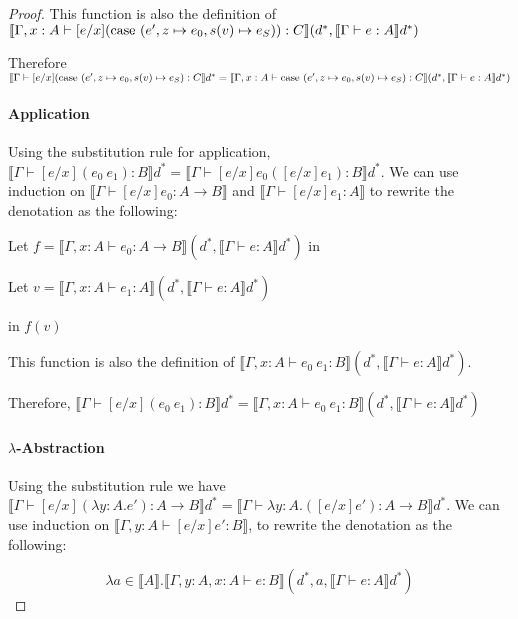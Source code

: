 \begin{proof}
This function is also the definition of $\llbracket \Gamma , x : A \vdash [e/x](\case \ (e',z \mapsto e_0, s(v) \mapsto e_S)): C \rrbracket (d^*, \llbracket \Gamma \vdash e : A \rrbracket d^*)$

Therefore $\llbracket \Gamma \vdash [e/x] (\operatorname{case} \ (e', z \mapsto e_0, s(v) \mapsto e_S): C \rrbracket d^* = \llbracket \Gamma , x : A \vdash \operatorname{case} \ (e', z \mapsto e_0, s(v) \mapsto e_S): C \rrbracket (d^*, \llbracket \Gamma \vdash e : A \rrbracket d^*)$

\paragraph{Application} Using the substitution rule for application, $\llbracket \Gamma \vdash [e/x](e_0 \ e_1) : B \rrbracket d^* = \llbracket \Gamma \vdash [e/x]e_0 ([e/x] e_1) : B \rrbracket d^*$. We can use induction on $\llbracket \Gamma \vdash [e/x]e_0 : A \to B \rrbracket$ and $ \llbracket \Gamma \vdash [e/x]e_1 : A \rrbracket$ to rewrite the denotation as the following:

Let $f = \llbracket \Gamma, x : A \vdash e_0 : A \to B \rrbracket (d^*,\llbracket \Gamma \vdash e : A \rrbracket d^*) $ in 

\hspace{4.5cm} Let $v = \llbracket \Gamma, x : A \vdash e_1 : A \rrbracket (d^*, \llbracket \Gamma \vdash e : A \rrbracket d^*)$ 

\hspace{7cm} in $f(v)$

This function is also the definition of $\llbracket \Gamma, x : A \vdash e_0 \ e_1 : B \rrbracket (d^*, \llbracket \Gamma \vdash e : A \rrbracket d^*)$.

Therefore, $\llbracket \Gamma \vdash [e/x](e_0 \ e_1) : B \rrbracket d^* = \llbracket \Gamma, x : A \vdash e_0 \ e_1 : B \rrbracket (d^*, \llbracket \Gamma \vdash e : A \rrbracket d^*)$


\paragraph{$\lambda$-Abstraction} Using the substitution rule we have $\llbracket \Gamma \vdash [e/x](\lambda y : A.e') : A \to B \rrbracket d^* = \llbracket \Gamma \vdash \lambda y : A. ([e/x] e') : A \to B \rrbracket d^*$. We can use induction on $\llbracket \Gamma, y : A \vdash [e/x] e' : B \rrbracket$, to rewrite the denotation as the following:

 \[\lambda a \in \llbracket A \rrbracket . \llbracket \Gamma, y : A, x : A  \vdash e : B \rrbracket(d^*, a , \llbracket \Gamma \vdash e : A \rrbracket d^*)\]


\end{proof}
